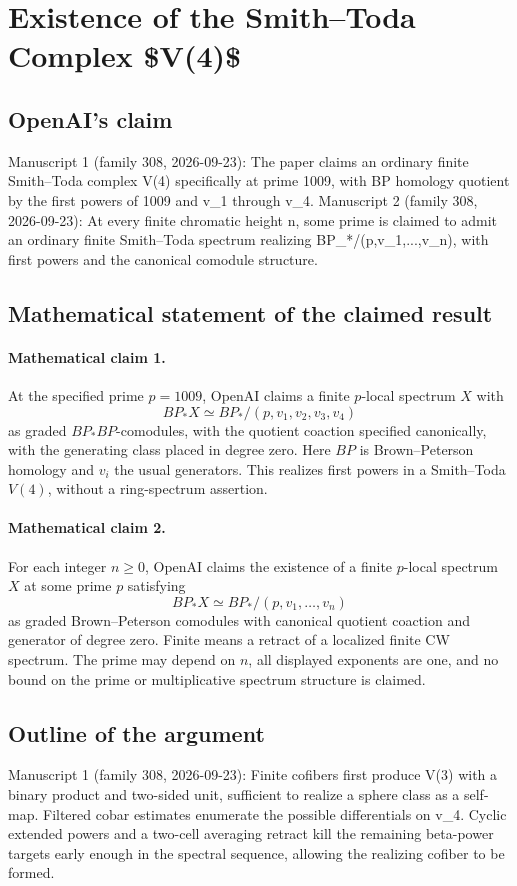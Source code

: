 \documentclass[11pt]{article}
\begin{document}
\section*{Existence of the Smith–Toda Complex \$V(4)\$}

\subsection{OpenAI's claim}
Manuscript 1 (family 308, 2026-09-23): The paper claims an ordinary finite Smith--Toda complex V(4) specifically at prime 1009, with BP homology quotient by the first powers of 1009 and v\_1 through v\_4. Manuscript 2 (family 308, 2026-09-23): At every finite chromatic height n, some prime is claimed to admit an ordinary finite Smith--Toda spectrum realizing BP\_*/(p,v\_1,...,v\_n), with first powers and the canonical comodule structure.

\subsection{Mathematical statement of the claimed result}
\paragraph{Mathematical claim 1.} At the specified prime $p=1009$, OpenAI claims a finite $p$-local spectrum $X$ with
\[
BP_*X\simeq BP_*/(p,v_1,v_2,v_3,v_4)
\]
as graded $BP_*BP$-comodules, with the quotient coaction specified canonically, with the generating class placed in degree zero. Here $BP$ is Brown--Peterson homology and $v_i$ the usual generators. This realizes first powers in a Smith--Toda $V(4)$, without a ring-spectrum assertion.

\paragraph{Mathematical claim 2.} For each integer $n\ge0$, OpenAI claims the existence of a finite $p$-local spectrum $X$ at some prime $p$ satisfying
\[
BP_*X\simeq BP_*/(p,v_1,\ldots,v_n)
\]
as graded Brown--Peterson comodules with canonical quotient coaction and generator of degree zero. Finite means a retract of a localized finite CW spectrum. The prime may depend on $n$, all displayed exponents are one, and no bound on the prime or multiplicative spectrum structure is claimed.

\subsection{Outline of the argument}
Manuscript 1 (family 308, 2026-09-23): Finite cofibers first produce V(3) with a binary product and two-sided unit, sufficient to realize a sphere class as a self-map. Filtered cobar estimates enumerate the possible differentials on v\_4. Cyclic extended powers and a two-cell averaging retract kill the remaining beta-power targets early enough in the spectral sequence, allowing the realizing cofiber to be formed.
\end{document}
